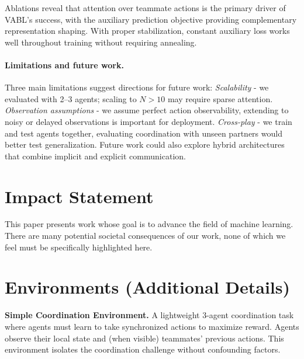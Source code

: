 \documentclass{article}
\theoremstyle{plain}
\theoremstyle{definition}
\theoremstyle{remark}
\begin{document}
Ablations reveal that attention over teammate actions is the primary driver of VABL's success, with the auxiliary prediction objective providing complementary representation shaping. With proper stabilization, constant auxiliary loss works well throughout training without requiring annealing.

\paragraph{Limitations and future work.}
Three main limitations suggest directions for future work: \textit{Scalability} - we evaluated with 2--3 agents; scaling to $N > 10$ may require sparse attention. \textit{Observation assumptions} - we assume perfect action observability, extending to noisy or delayed observations is important for deployment. \textit{Cross-play} - we train and test agents together, evaluating coordination with unseen partners would better test generalization. Future work could also explore hybrid architectures that combine implicit and explicit communication.


\section{Impact Statement}

This paper presents work whose goal is to advance the field of machine learning. There are many potential societal consequences of our work, none of which we feel must be specifically highlighted here.




\newpage
\appendix
\onecolumn

\section{Environments (Additional Details)}
\label{app:env_details}

\textbf{Simple Coordination Environment.} A lightweight 3-agent coordination task where agents must learn to take synchronized actions to maximize reward. Agents observe their local state and (when visible) teammates' previous actions. This environment isolates the coordination challenge without confounding factors.
\end{document}
